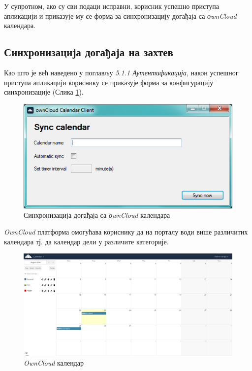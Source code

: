 У супротном, ако су сви подаци исправни, корисник успешно приступа апликацији и приказује му се форма за синхронизацију догађаја са \textit{оwnCloud} календара.

\subsection{Синхронизација догађаја на захтев}

Као што је већ наведено у поглављу \textit{5.1.1 Аутентификација}, након успешног приступа апликацији кориснику се приказује форма за конфигурацију синхронизације (Слика \ref{fig:sync_calendar}).

\begin{figure}[H]
	\centering
	\includegraphics[scale=0.5]{slike/SyncCalendar.png}
	\caption{Синхронизација догађаја са \textit{оwnCloud} календара}
	\label{fig:sync_calendar}
\end{figure}

\textit{OwnCloud} платформа омогућава кориснику да на порталу води више различитих календара тј. да календар дели у различите категорије. 

\begin{figure}[H]
	\centering
	\includegraphics[scale=0.4]{slike/ownCloudCalendar.png}
	\caption{\textit{OwnCloud} календар}
	\label{fig:own_cloud_calendar}
\end{figure}


